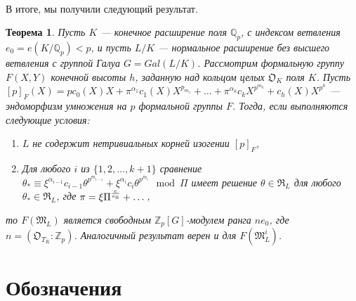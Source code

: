 \documentclass[a4paper]{article}
\newcommand{\Qp}{\mathbb{Q}_p}
\newcommand{\Zp}{\mathbb{Z}_p}
\newcommand{\ML}{\mathfrak{M}_L}
\newcommand{\OK}{\mathfrak{O}_K}
\newcommand{\OTK}{\mathfrak{O}_{T_K}}
\newcommand{\RL}{\mathfrak{R}_L}
\newtheorem{theorem}{Теорема}
\begin{document}
\paragraph{}
В итоге, мы получили следующий результат.
\begin{theorem}
Пусть $K$ --- конечное расширение поля $\Qp$, с индексом ветвления $e_0=e(K/\Qp)<p$, и пусть $L/K$ --- нормальное расширение без высшего ветвления с группой Галуа $G=Gal(L/K)$. Рассмотрим формальную группу $F(X,Y)$ конечной высоты $h$, заданную над кольцом целых $\OK$ поля $K$. Пусть $[p]_F(X)=pc_0(X)X+\pi^{\alpha_1}c_1(X)X^{p_{m_1}}+\dots+\pi^{\alpha_k}c_kX^{p^{m_k}}+c_h(X)X^{p^h}$ --- эндоморфизм умножения на $p$ формальной группы $F$. Тогда, если выполняются следующие условия:
\begin{enumerate}
\item $L$ не содержит нетривиальных корней изогении $[p]_F$,
\item Для любого $i$ из $\{1,2,\dots,k+1\}$ сравнение $\theta_*\equiv\xi^{\alpha_{i-1}}c_{i-1}\theta^{p^{m_{i-1}}}+\xi^{\alpha_{i}}c_{i}\theta^{p^{m_{i}}}\mod\Pi$ имеет решение $\theta\in\RL$ для любого $\theta_*\in\RL$, где $\pi=\xi\Pi^{e\over e_0}+\dots$,
\end{enumerate}
то $F(\ML)$ является свободным $\Zp[G]$-модулем ранга $ne_0$, где $n=(\OTK:\Zp)$. Аналогичный результат верен и для $F(\ML^i)$.
\end{theorem}

\pagebreak

\section{Обозначения}
\end{document}
